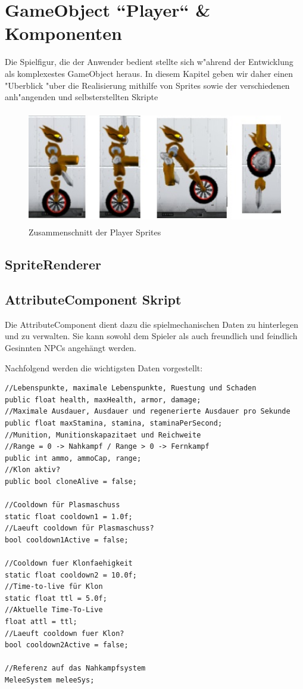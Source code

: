 \chapter{GameObject ``Player`` \& Komponenten}

Die Spielfigur, die der Anwender bedient stellte sich w"ahrend der Entwicklung als komplexestes GameObject heraus. In diesem Kapitel geben wir daher einen "Uberblick "uber die Realisierung mithilfe von Sprites sowie der verschiedenen anh"angenden und selbsterstellten Skripte

\begin{figure}
	\centering
	\includegraphics[height=5cm]{images/AnimationenZusammenschnitt.jpg}
	\caption{Zusammenschnitt der Player Sprites}
	\label{fig:playerSprites}
\end{figure}

\section{SpriteRenderer}

\section{AttributeComponent Skript}
Die AttributeComponent dient dazu die spielmechanischen Daten zu hinterlegen und zu verwalten. Sie kann sowohl dem Spieler als auch freundlich und feindlich Gesinnten NPCs angehängt werden. 

Nachfolgend werden die wichtigsten Daten vorgestellt:
\begin{lstlisting}[breaklines=true]
//Lebenspunkte, maximale Lebenspunkte, Ruestung und Schaden
public float health, maxHealth, armor, damage;
//Maximale Ausdauer, Ausdauer und regenerierte Ausdauer pro Sekunde
public float maxStamina, stamina, staminaPerSecond;
//Munition, Munitionskapazitaet und Reichweite
//Range = 0 -> Nahkampf / Range > 0 -> Fernkampf
public int ammo, ammoCap, range;
//Klon aktiv?
public bool cloneAlive = false;

//Cooldown für Plasmaschuss
static float cooldown1 = 1.0f;
//Laeuft cooldown für Plasmaschuss?
bool cooldown1Active = false;

//Cooldown fuer Klonfaehigkeit
static float cooldown2 = 10.0f;
//Time-to-live für Klon
static float ttl = 5.0f;
//Aktuelle Time-To-Live
float attl = ttl;
//Laeuft cooldown fuer Klon?
bool cooldown2Active = false;

//Referenz auf das Nahkampfsystem
MeleeSystem meleeSys;
\end{lstlisting}


